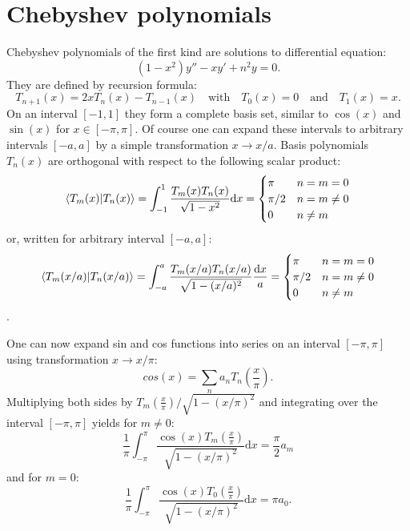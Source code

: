 \documentclass[openany, longbibliography,slovene,a4paper,12pt]{article}
\newcommand{\dif}{\mathrm{d}}
\begin{document}
\section*{Chebyshev polynomials}
Chebyshev polynomials of the first kind are solutions to differential equation:
\begin{equation}
  (1-x^2)y''-xy'+n^2y=0.
  \end{equation}
  They are defined by recursion formula:
  \begin{equation}
    T_{n+1}(x)=2xT_n(x)-T_{n-1}(x) \quad \mathrm{with} \quad T_0(x)=0 \quad\mathrm{and}\quad T_1(x)=x.
  \end{equation}
On an interval $[-1,1]$ they form a complete basis set, similar to $\cos(x)$ and
$\sin(x)$ for  $x\in[-\pi, \pi]$. Of course one can expand these intervals to
arbitrary intervals $[-a,a]$ by a simple transformation $x\rightarrow x/a$.
Basis polynomials $T_n(x)$ are orthogonal with respect to the following scalar
product:
\[
  \braket{T_m(x)|T_n(x)}=\int_{-1}^{1}\frac{T_m(x)T_n(x)}{\sqrt{1-x^2}}\dif x = \begin{cases}
                                   \pi & n=m=0  \\
                                   \pi/2 & n=m \neq 0\\
                                   0 & n \neq m \\
  \end{cases}
\]
or, written for arbitrary interval $[-a, a]$:
\[
  \braket{T_m(x/a)|T_n(x/a)}=\int_{-a}^{a}\frac{T_m(x/a)T_n(x/a)}{\sqrt{1-(x/a)^2}}
  \frac{\dif x}{a} = \begin{cases}
                                   \pi & n=m=0  \\
                                   \pi/2 & n=m \neq 0\\
                                   0 & n \neq m \\
  \end{cases}
\].

One can now expand sin and cos functions into series on an interval $[-\pi,
\pi]$ using transformation $x\rightarrow x/\pi$:
\begin{equation}
  cos(x)=\sum_na_nT_n\left(\frac{x}{\pi}\right).
  \end{equation}
Multiplying both sides by $T_m(\frac{x}{\pi})/\sqrt{1-(x/\pi)^2}$ and
integrating over the interval $[-\pi, \pi]$ yields for $m\neq0$:
\begin{equation} \label{coeffm}
 \frac{1}{\pi}\int_{-\pi}^{\pi}\frac{\cos(x)T_m(\frac{x}{\pi})}{\sqrt{1-(x/\pi)^2}} \dif x = \frac{\pi}{2}a_m
\end{equation}
and for $m=0$:
\begin{equation}\label{coeff0}
 \frac{1}{\pi}\int_{-\pi}^{\pi}\frac{\cos(x)T_0(\frac{x}{\pi})}{\sqrt{1-(x/\pi)^2}} \dif x = \pi a_0.
\end{equation}
\end{document}
